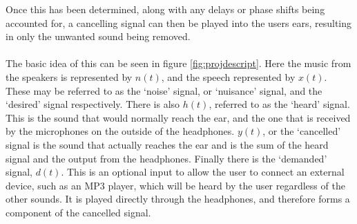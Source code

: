 Once this has been determined, along with any delays or phase shifts being accounted for, a cancelling signal can then be played into the users ears, resulting in only the unwanted sound being removed.
\\
\\
The basic idea of this can be seen in figure \ref{fig:projdescript}.
Here the music from the speakers is represented by $n(t)$, and the speech represented by $x(t)$.
These may be referred to as the `noise' signal, or `nuisance' signal, and the `desired' signal respectively.
There is also $h(t)$, referred to as the `heard' signal.
This is the sound that would normally reach the ear, and the one that is received by the microphones on the outside of the headphones.
$y(t)$, or the `cancelled' signal is the sound that actually reaches the ear and is the sum of the heard signal and the output from the headphones.
Finally there is the `demanded' signal, $d(t)$.
This is an optional input to allow the user to connect an external device, such as an MP3 player, which will be heard by the user regardless of the other sounds.
It is played directly through the headphones, and therefore forms a component of the cancelled signal. 

